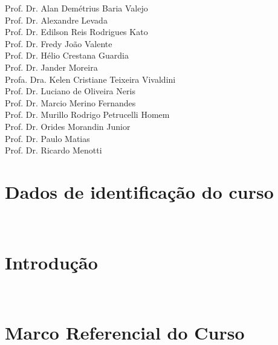 \documentclass[11pt,a4paper]{report}
\begin{document}
\begin{center}
    Prof. Dr. Alan Demétrius Baria Valejo\\
    Prof. Dr. Alexandre Levada\\
    Prof. Dr. Edilson Reis Rodrigues Kato\\
    Prof. Dr. Fredy João Valente\\
    Prof. Dr. Hélio Crestana Guardia\\
    Prof. Dr. Jander Moreira\\
    Profa. Dra. Kelen Cristiane Teixeira Vivaldini\\
    Prof. Dr. Luciano de Oliveira Neris\\
    Prof. Dr. Marcio Merino Fernandes\\
    Prof. Dr. Murillo Rodrigo Petrucelli Homem \\
    Prof. Dr. Orides Morandin Junior\\
    Prof. Dr. Paulo Matias\\
    Prof. Dr. Ricardo Menotti\\

    \vspace{1.5ex}

\end{center}


\clearpage


\chapter*{Dados de identificação do curso}~\label{cha:dados}


\singlespacing
\tableofcontents
\listoffigures
\listoftables

\doublespacing


\chapter{Introdução}~\label{cha:intro}


\chapter{Marco Referencial do Curso}~\label{cha:MarcoReferencial}

\end{document}

